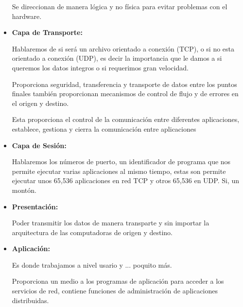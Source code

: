 \documentclass[12pt, fleqn]{report}                             %
\theoremstyle{break}                                            %
\begin{document}
\begin{itemize}
                    Se direccionan de manera lógica y no física para evitar problemas con el hardware.

                \item \textbf{Capa de Transporte:}

                    Hablaremos de si será un archivo orientado a conexión (TCP), o si no esta orientado
                    a conexión (UDP), es decir la importancia que le damos a si queremos los datos integros
                    o si requerimos gran velocidad.

                    Proporciona seguridad, transferencia y transporte de datos entre los puntos finales
                    también proporcionan mecanismos de control de flujo y de errores en el origen y destino.

                    Esta proporciona el control de la comunicación entre diferentes aplicaciones, establece,
                    gestiona y cierra la comunicación entre aplicaciones

                \clearpage

                \item \textbf{Capa  de Sesión:}

                    Hablaremos los números de puerto, un identificador de programa que nos permite ejecutar
                    varias aplicaciones al mismo tiempo, estas son permite ejecutar unos 65,536 aplicaciones
                    en red TCP y otros 65,536 en UDP. Si, un montón.

                \item \textbf{Presentación:}

                    Poder transmitir los datos de manera transparte y sin importar la arquitectura de las
                    computadoras de origen y destino.

                \item \textbf{Aplicación:}

                    Es donde trabajamos a nivel usario y ... poquito más.

                    Proporciona un medio a los programas de aplicación para acceder a los servicios de red,
                    contiene funciones de administración de aplicaciones distribuidas.

            \end{itemize}


\end{document}
